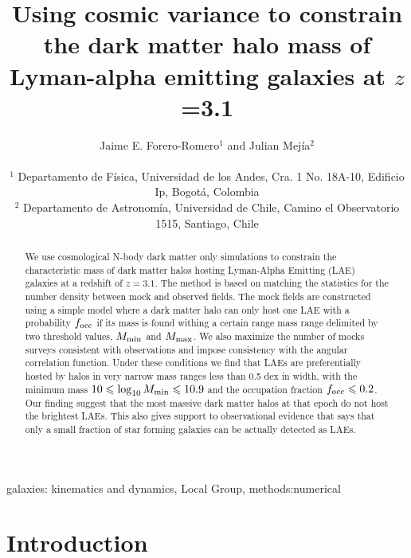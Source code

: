 \documentclass[usenatbib]{mn2e}
\begin{document}
\title[Dark Matter Halo Mass for LAEs  at $z=3.1$]{Using cosmic
  variance to constrain the dark matter halo mass of Lyman-alpha
  emitting galaxies at $z$=3.1} 
  
\author[~J.~E. Forero-Romero and J. Mejia]{
\parbox[t]{\textwidth}{\raggedright 
Jaime E. Forero-Romero$^{1}$ and
Julian Mej\'ia$^{2}$ 
}
\vspace*{6pt}\\
$^{1}$ Departamento de F\'{i}sica, Universidad de los Andes, Cra. 1
No. 18A-10, Edificio Ip, Bogot\'a, Colombia \\
$^{2}$ Departamento de Astronom\'{i}a, Universidad de Chile, Camino el Observatorio 1515, Santiago, Chile}

\maketitle

\begin{abstract}
We use cosmological N-body dark matter only simulations to constrain the
characteristic mass of dark matter halos hosting Lyman-Alpha Emitting
(LAE) galaxies at a redshift of $z=3.1$. The method is based on
matching the statistics for the number density between mock and
observed fields. The mock fields are constructed using a simple model
where a dark matter halo can only host one LAE with a probability
$f_{\rm occ}$ if its mass is found withing a certain range mass range
delimited by two threshold values, $M_{\rm min}$ and $M_{\rm max}$. 
We also maximize the number of mocks surveys consistent with
observations and impose consistency with the angular correlation
function. Under these conditions we find that LAEs are preferentially
hosted by halos in very narrow mass ranges less than 0.5 dex in width,
with the minimum mass $10\leq \log_{10}M_{\rm min}\leq 10.9$ and the
occupation fraction $f_{\rm   occ}\leq 0.2$.  Our finding suggest that
the most massive dark matter halos at that epoch do not host the
brightest LAEs. This also gives support to observational evidence that
says that only a small fraction of star forming galaxies can be
actually detected as LAEs.
\end{abstract}

\begin{keywords}
{galaxies: kinematics and dynamics, Local Group, methods:numerical}
\end{keywords}


\section{Introduction}
\end{document}
